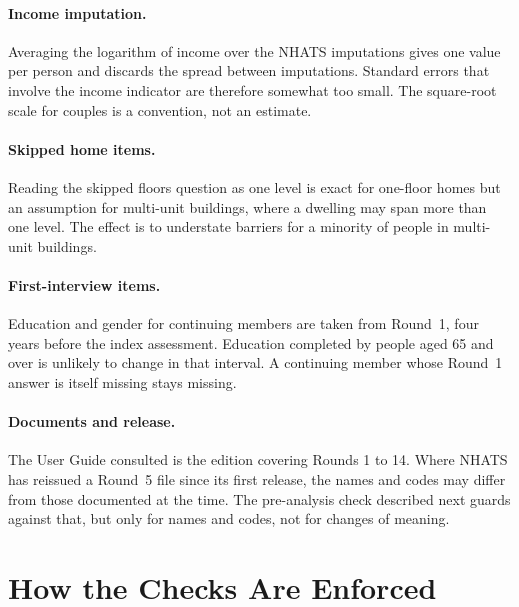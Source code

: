 \paragraph{Income imputation.} Averaging the logarithm of income over the NHATS
imputations gives one value per person and discards the spread between
imputations. Standard errors that involve the income indicator are therefore
somewhat too small. The square-root scale for couples is a convention, not an
estimate.

\paragraph{Skipped home items.} Reading the skipped floors question as one
level is exact for one-floor homes but an assumption for multi-unit buildings,
where a dwelling may span more than one level. The effect is to understate
barriers for a minority of people in multi-unit buildings.

\paragraph{First-interview items.} Education and gender for continuing members
are taken from Round~1, four years before the index assessment. Education
completed by people aged 65 and over is unlikely to change in that interval.
A continuing member whose Round~1 answer is itself missing stays missing.

\paragraph{Documents and release.} The User Guide consulted is the edition
covering Rounds 1 to 14. Where NHATS has reissued a Round~5 file since its
first release, the names and codes may differ from those documented at the
time. The pre-analysis check described next guards against that, but only for
names and codes, not for changes of meaning.

\section{How the Checks Are Enforced}
\label{sec:G_enforce}

